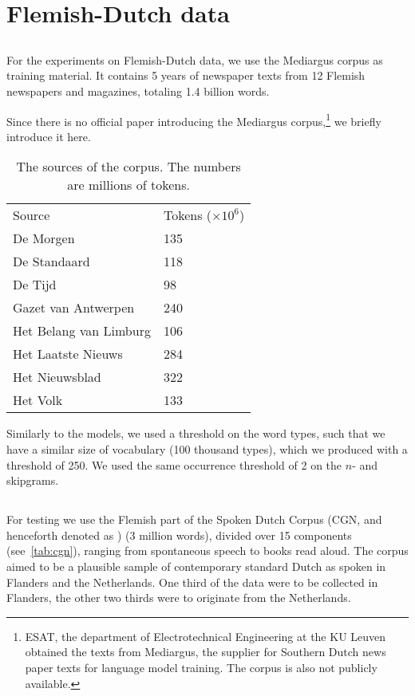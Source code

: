 \section{Flemish-Dutch data}
\subsection{\mediargus}
For the experiments on Flemish-Dutch data, we use the Mediargus corpus as training material. It contains 5 years of newspaper texts from 12 Flemish newspapers and magazines, totaling 1.4 billion words.

Since there is no official paper introducing the Mediargus corpus,\footnote{ESAT, the department of Electrotechnical Engineering at the KU Leuven obtained the texts from Mediargus, the supplier for Southern Dutch news paper texts for language model training. The corpus is also not publicly available.} we briefly introduce it here.

\begin{table}
	\begin{tabular}{ll}
    	Source & \thead{Tokens \\ ($\times 10^6$)} \\
    	De Morgen & 135 \\
        De Standaard & 118 \\
        De Tijd & 98 \\
        Gazet van Antwerpen & 240 \\
        Het Belang van Limburg & 106 \\
        Het Laatste Nieuws & 284 \\
        Het Nieuwsblad & 322 \\
        Het Volk & 133
    \end{tabular}
    \caption{The sources of the \mediargus corpus. The numbers are millions of tokens.}
\end{table}

	Similarly to the \obw models, we used a threshold on the word types, such that we have a similar size of vocabulary (100 thousand types), which we produced with a threshold of 250. We used the same occurrence threshold of 2 on the $n$- and skipgrams.
 
    
    \subsection{\cgn}
    For testing we use the Flemish part of the Spoken Dutch Corpus (CGN, and henceforth denoted as \cgn) \citep{oostdijk2000spoken} (3 million words), divided over 15 components (see~\cref{tab:cgn}), ranging from spontaneous speech to books read aloud. The corpus aimed to be a plausible sample of contemporary standard Dutch as spoken in Flanders and the Netherlands. One third of the data were to be collected in Flanders, the other two thirds were to originate from the Netherlands.

